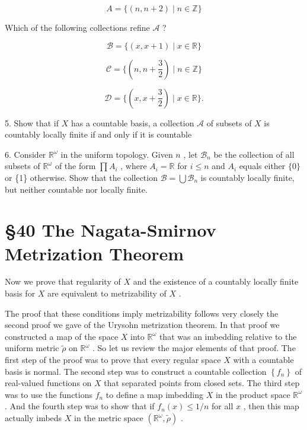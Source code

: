 \documentclass[10pt]{article}
\begin{document}
\[
A = \{ \left( {n,n + 2}\right)  \mid  n \in  \mathbb{Z}\}
\]

Which of the following collections refine \(\mathcal{A}\) ?

\[
\mathcal{B} = \{ \left( {x,x + 1}\right)  \mid  x \in  \mathbb{R}\}
\]

\[
\mathcal{C} = \{ \left( {n,n + \frac{3}{2}}\right)  \mid  n \in  \mathbb{Z}\}
\]

\[
\mathcal{D} = \{ \left( {x,x + \frac{3}{2}}\right)  \mid  x \in  \mathbb{R}\} .
\]

5. Show that if \(X\) has a countable basis, a collection \(\mathcal{A}\) of subsets of \(X\) is countably locally finite if and only if it is countable

6. Consider \({\mathbb{R}}^{\omega }\) in the uniform topology. Given \(n\) , let \({\mathcal{B}}_{n}\) be the collection of all subsets of \({\mathbb{R}}^{\omega }\) of the form \(\prod {A}_{i}\) , where \({A}_{i} = \mathbb{R}\) for \(i \leq  n\) and \({A}_{i}\) equals either \(\{ 0\}\) or \{1\} otherwise. Show that the collection \(\mathcal{B} = \bigcup {\mathcal{B}}_{n}\) is countably locally finite, but neither countable nor locally finite.

\section*{§40 The Nagata-Smirnov Metrization Theorem}

Now we prove that regularity of \(X\) and the existence of a countably locally finite basis for \(X\) are equivalent to metrizability of \(X\) .

The proof that these conditions imply metrizability follows very closely the second proof we gave of the Urysohn metrization theorem. In that proof we constructed a map of the space \(X\) into \({\mathbb{R}}^{\omega }\) that was an imbedding relative to the uniform metric \(\widetilde{\rho }\) on \({\mathbb{R}}^{\omega }\) . So let us review the major elements of that proof. The first step of the proof was to prove that every regular space \(X\) with a countable basis is normal. The second step was to construct a countable collection \(\left\{  {f}_{n}\right\}\) of real-valued functions on \(X\) that separated points from closed sets. The third step was to use the functions \({f}_{n}\) to define a map imbedding \(X\) in the product space \({\mathbb{R}}^{\omega }\) . And the fourth step was to show that if \({f}_{n}\left( x\right)  \leq  1/n\) for all \(x\) , then this map actually imbeds \(X\) in the metric space \(\left( {{\mathbb{R}}^{\omega },\widetilde{\rho }}\right)\) .
\end{document}
